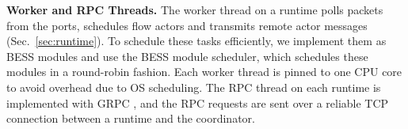 \vspace{1mm}
\noindent \textbf{Worker and RPC Threads.}
The worker thread on a runtime polls packets from the ports, schedules flow actors and transmits remote actor messages (Sec.~\ref{sec:runtime}). To schedule these tasks efficiently, we implement them as BESS modules and use the BESS module scheduler, which schedules these modules in a round-robin fashion. Each worker thread is pinned to one CPU core to avoid overhead due to OS scheduling. %
 The RPC thread on each runtime is implemented with GRPC \cite{grpc}, and the RPC requests are sent over a reliable TCP connection between a runtime and the coordinator.






